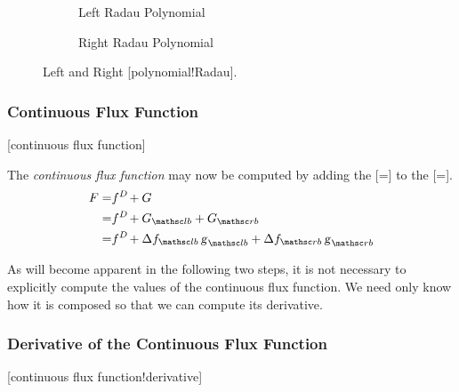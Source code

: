 
\begin{figure}
  \begin{centering}
    \begin{subfigure}{3.0in}
      \caption{Left Radau Polynomial}
      \label{FIG:LeftRadauPoly}
    \end{subfigure}%
    \begin{subfigure}{3.0in}
      \caption{Right Radau Polynomial}
      \label{FIG:RightRadauPoly}
    \end{subfigure}
    \caption{Left and Right [polynomial!Radau].}
    \label{FIG:RadauPoly}
  \end{centering}
\end{figure}



\subsubsection{Continuous Flux Function}
\label{SEC:Intro:FR:ContinuousFlux}%
[continuous flux function]


The \emph{continuous flux function} may now be computed by adding
the [=] to
the [=].
\begin{align}
  \fC =& \fD + \G \\
      =& \fD + \GL + \GR \\
      =& \fD + \fluxjumpL{} \, \gL + \fluxjumpR{} \, \gR
\end{align}

As will become apparent in the following two steps,
it is not necessary to explicitly compute the values of the
continuous flux function.
%
We need only know how it is composed so that we can compute its derivative.


\subsubsection{Derivative of the Continuous Flux Function}%
\label{SEC:Intro:FR:DerivativeFlux}
     [continuous flux function!derivative]

